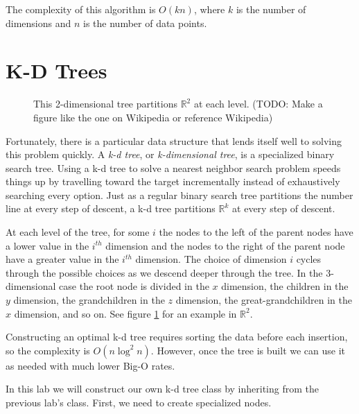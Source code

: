The complexity of this algorithm is $O(kn)$, where $k$ is the number of dimensions and $n$ is the number of data points.

\section*{K-D Trees}

\begin{figure}
\caption{This 2-dimensional tree partitions $\mathbb{R}^2$ at each level. (TODO: Make a figure like the one on Wikipedia or reference Wikipedia)}
\label{fig:k-binary-search}
\end{figure}

Fortunately, there is a particular data structure that lends itself well to solving this problem quickly.
A \emph{k-d tree}, or \emph{k-dimensional tree}, is a specialized binary search tree.
Using a k-d tree to solve a nearest neighbor search problem speeds things up by travelling toward the target incrementally instead of exhaustively searching every option.
Just as a regular binary search tree partitions the number line at every step of descent, a k-d tree partitions $\mathbb{R}^k$ at every step of descent.

At each level of the tree, for some $i$ the nodes to the left of the parent nodes have a lower value in the $i^{th}$ dimension and the nodes to the right of the parent node have a greater value in the $i^{th}$ dimension.
The choice of dimension $i$ cycles through the possible choices as we descend deeper through the tree.
In the $3$-dimensional case the root node is divided in the $x$ dimension, the children in the $y$ dimension, the grandchildren in the $z$ dimension, the great-grandchildren in the $x$ dimension, and so on.
See figure \ref{fig:k-binary-search} for an example in $\mathbb{R}^2$.

Constructing an optimal k-d tree requires sorting the data before each insertion, so the complexity is $O(n\log^2{n})$. However, once the tree is built we can use it as needed with much lower Big-O rates.

In this lab we will construct our own k-d tree class by inheriting from the previous lab's  class. First, we need to create specialized nodes.

